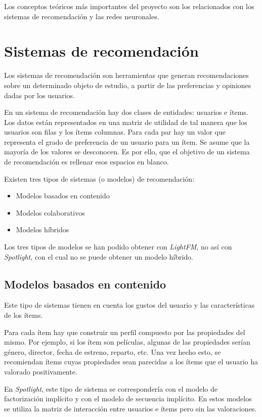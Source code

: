 
Los conceptos teóricos más importantes del proyecto son los relacionados con los sistemas de recomendación y las redes neuronales.

\section{Sistemas de recomendación}\label{sistemas-de-recomendacion}
Los sistemas de recomendación son herramientas que generan recomendaciones sobre un determinado objeto de estudio, a partir de las preferencias y opiniones dadas por los usuarios. \cite{sistemas-recomendacion}

En un sistema de recomendación hay dos clases de entidades: usuarios e ítems. Los datos están representados en una matriz de utilidad de tal manera que los usuarios son filas y los ítems columnas. Para cada par hay un valor que representa el grado de preferencia de un usuario para un ítem. Se asume que la mayoría de los valores se desconocen. Es por ello, que el objetivo de un sistema de recomendación es rellenar esos espacios en blanco.

Existen tres tipos de sistemas (o modelos) de recomendación:
\begin{itemize}
\tightlist
\item Modelos basados en contenido
\item Modelos colaborativos
\item Modelos híbridos
\end{itemize}

Los tres tipos de modelos se han podido obtener con \textit{LightFM}, no así con \textit{Spotlight}, con el cual no se puede obtener un modelo híbrido.

\subsection{Modelos basados en contenido}\label{content-based-systems}
Este tipo de sistemas tienen en cuenta los gustos del usuario y las características de los ítems.

Para cada ítem hay que construir un perfil compuesto por las propiedades del mismo. Por ejemplo, si los ítem son películas, algunas de las propiedades serían género, director, fecha de estreno, reparto, etc. Una vez hecho esto, se recomiendan ítems cuyas propiedades sean parecidas a los ítems que el usuario ha valorado positivamente.

En \textit{Spotlight}, este tipo de sistema se correspondería con el modelo de factorización implícito y con el modelo de secuencia implícito. En estos modelos se utiliza la matriz de interacción entre usuarios e ítems pero sin las valoraciones.

